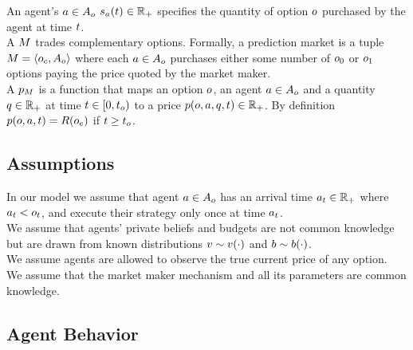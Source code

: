 An agent's $a\in A_o$  
$s_a(t) \in \mathbb{R}_+$ specifies the quantity of option 
$o$ purchased by the agent at time $t$.\\

A  $M$ trades complementary options. 
Formally, a prediction market is a tuple $M = 
\left<o_c, A_o \right>$ where each  
$a\in A_o$ purchases 
either some number of $o_0$ or $o_1$ options paying the price quoted by the 
market maker.\\


A  $p_M$ is a function 
that maps an option $o$, an agent $a \in A_o$ 
and a quantity $q\in\mathbb{R}_+$ at time $t \in [0,t_o)$ 
to a price $p(o,a,q,t) \in \mathbb{R}_+$. 
By definition $p(o,a, t) = R(o_e)$ if 
$t \ge t_o$.

\subsection{Assumptions}

In our model we assume that agent $a \in A_o$ has an arrival time 
$a_t \in \mathbb{R}_+$ where $a_t < o_t$, 
and execute their strategy only once at time $a_t$.\\

We assume that agents' private beliefs and budgets are not common knowledge
but are drawn from known distributions $v \sim v(\cdot)$ and
$b \sim b(\cdot)$.\\

We assume agents are allowed to observe the true current price of any option.\\

We assume that the market maker mechanism and all its parameters are common knowledge.\\


\subsection{Agent Behavior}
 \\

